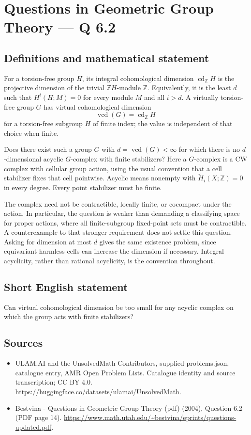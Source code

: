 \documentclass[11pt,a4paper]{article}
\begin{document}
\section*{Questions in Geometric Group Theory — Q 6.2}\label{statement}

\subsection{Definitions and mathematical statement}
For a torsion-free group $H$, its integral cohomological dimension $\operatorname{cd}_{\mathbb Z}H$ is the projective dimension of the trivial $\mathbb ZH$-module $\mathbb Z$. Equivalently, it is the least $d$ such that $H^i(H;M)=0$ for every module $M$ and all $i>d$. A virtually torsion-free group $G$ has virtual cohomological dimension
\[
 \operatorname{vcd}(G)=\operatorname{cd}_{\mathbb Z}H
\]
for a torsion-free subgroup $H$ of finite index; the value is independent of that choice when finite.

Does there exist such a group $G$ with $d=\operatorname{vcd}(G)<\infty$ for which there is no $d$-dimensional acyclic $G$-complex with finite stabilizers? Here a $G$-complex is a CW complex with cellular group action, using the usual convention that a cell stabilizer fixes that cell pointwise. Acyclic means nonempty with $\widetilde H_i(X;\mathbb Z)=0$ in every degree. Every point stabilizer must be finite.

The complex need not be contractible, locally finite, or cocompact under the action. In particular, the question is weaker than demanding a classifying space for proper actions, where all finite-subgroup fixed-point sets must be contractible. A counterexample to that stronger requirement does not settle this question. Asking for dimension at most $d$ gives the same existence problem, since equivariant harmless cells can increase the dimension if necessary. Integral acyclicity, rather than rational acyclicity, is the convention throughout.
\subsection{Short English statement}
Can virtual cohomological dimension be too small for any acyclic complex on which the group acts with finite stabilizers?
\subsection{Sources}
\begin{itemize}
\item[S1] ULAM.AI and the UnsolvedMath Contributors, supplied problems.json, catalogue entry, AMR Open Problem Lists. Catalogue identity and source transcription; CC BY 4.0.
\url{https://huggingface.co/datasets/ulamai/UnsolvedMath}.
\item[S2] Bestvina - Questions in Geometric Group Theory (pdf) (2004), Question 6.2 (PDF page 14). 
\url{https://www.math.utah.edu/~bestvina/eprints/questions-updated.pdf}.
\end{itemize}
\end{document}
